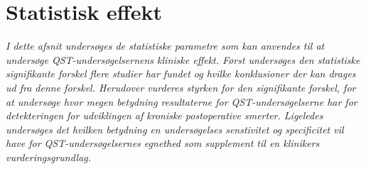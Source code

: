 \section{Statistisk effekt}
\textit{I dette afsnit undersøges de statistiske parametre som kan anvendes til at undersøge QST-undersøgelsernens kliniske effekt. Først undersøges den statistiske signifikante forskel flere studier har fundet og hvilke konklusioner der kan drages ud fra denne forskel. Herudover vurderes styrken for den signifikante forskel, for at undersøge hvor megen betydning resultaterne for QST-undersøgelserne har for detekteringen for udviklingen af kroniske postoperative smerter. Ligeledes undersøges det hvilken betydning en undersøgelses senstivitet og specificitet vil have for QST-undersøgelsernes egnethed som supplement til en klinikers vurderingsgrundlag.}

